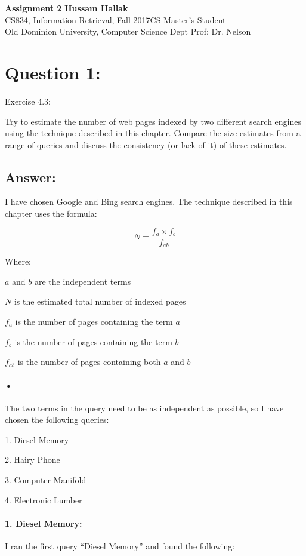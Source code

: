 \documentclass[a4paper, 11pt]{article}
\begin{document}
\noindent
\large\textbf{Assignment 2} \hfill \textbf{Hussam Hallak} \\
\normalsize CS834, Information Retrieval, Fall 2017\hfill CS Master's Student \\
Old Dominion University, Computer Science Dept \hfill Prof: Dr. Nelson 

\section*{Question 1:}
Exercise 4.3: 

Try to estimate the number of web pages indexed by two different search engines using the technique described in this chapter. Compare the size estimates from a range of queries and discuss the consistency (or lack of it) of these estimates.

\subsection*{Answer:}
I have chosen Google and Bing search engines. The technique described in this chapter uses the formula:

$$
N=\frac{f_a \times f_b}{f_{ab}}
$$

Where:

$a$ and $b$ are the independent terms

$N$ is the estimated total number of indexed pages

$f_a$ is the number of pages containing the term $a$

$f_b$ is the number of pages containing the term $b$

$f_{ab}$ is the number of pages containing both $a$ and $b$

\paragraph{•}
The two terms in the query need to be as independent as possible, so I have chosen the following queries:

1. Diesel Memory

2. Hairy Phone

3. Computer Manifold

4. Electronic Lumber

\paragraph{1. Diesel Memory:}
I ran the first query ``Diesel Memory'' and found the following:
\end{document}
